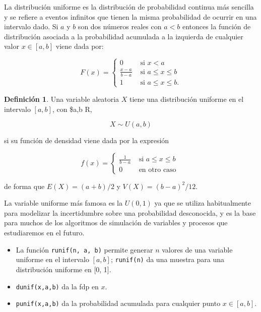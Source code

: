 \documentclass[
]{book}
\providecommand{\tightlist}{%
  \setlength{\itemsep}{0pt}\setlength{\parskip}{0pt}}
\newenvironment{yellowbox}{
  \definecolor{shadecolor}{rgb}{210, 180, 140}  
  \color{black}
  \begin{shaded}}
 {\end{shaded}}
\newenvironment{whitebox}{
  \definecolor{shadecolor}{rgb}{255, 255, 255}  
  \color{black}
  \begin{shaded}}
 {\end{shaded}}
\theoremstyle{definition}
\newtheorem{definition}{Definición}[chapter]
\theoremstyle{definition}
\theoremstyle{definition}
\theoremstyle{definition}
\theoremstyle{remark}
\begin{document}
La distribución uniforme es la distribución de probabilidad continua más sencilla y se refiere a eventos infinitos que tienen la misma probabilidad de ocurrir en una intervalo dado. Si \(a\) y \(b\) son dos números reales con \(a < b\) entonces la función de distribución asociada a la probabilidad acumulada a la izquierda de cualquier valor \(x \in [a, b]\) viene dada por:

\begin{equation}
F(x) = 
\begin{cases}
0 & \text{ si } x < a \\
\frac{x-a}{b-a} & \text{ si } a \leq x \leq b\\
1 & \text{ si } a \leq x \leq b.
\end{cases}
\label{eq:var-uniforme2}
\end{equation}

\begin{yellowbox}

\begin{definition}
\protect\hypertarget{def:vuniforme}{}{\label{def:vuniforme} }Una variable aleatoria \(X\) tiene una distribución uniforme en el intervalo \([a, b]\), con \$a,b \in R,

\[X \sim U(a,b)\]

si su función de densidad viene dada por la expresión

\begin{equation}
f(x) = 
\begin{cases}
\frac{1}{b-a} & \text{ si } a \leq x \leq b\\
0 & \text{ en otro caso }
\end{cases}
\label{eq:var-uniforme}
\end{equation}

de forma que \(E(X) = (a+b)/2\) y \(V(X) = (b-a)^2/12.\)\\
\end{definition}

\end{yellowbox}

La variable uniforme más famosa es la \(U(0,1)\) ya que se utiliza habitualmente para modelizar la incertidumbre sobre una probabilidad desconocida, y es la base para muchos de los algoritmos de simulación de variables y procesos que estudiaremos en el futuro.

\begin{whitebox}

\begin{itemize}
\tightlist
\item
  La función \texttt{runif(n,\ a,\ b)} permite generar \(n\) valores de una variable uniforme en el intervalo \([a, b]\); \texttt{runif(n)} da una muestra para una distribución uniforme en {[}0, 1{]}.
\item
  \texttt{dunif(x,a,b)} da la fdp en \(x\).
\item
  \texttt{punif(x,a,b)} da la probabilidad acumulada para cualquier punto \(x \in [a,b]\).
\end{itemize}

\end{whitebox}
\end{document}
